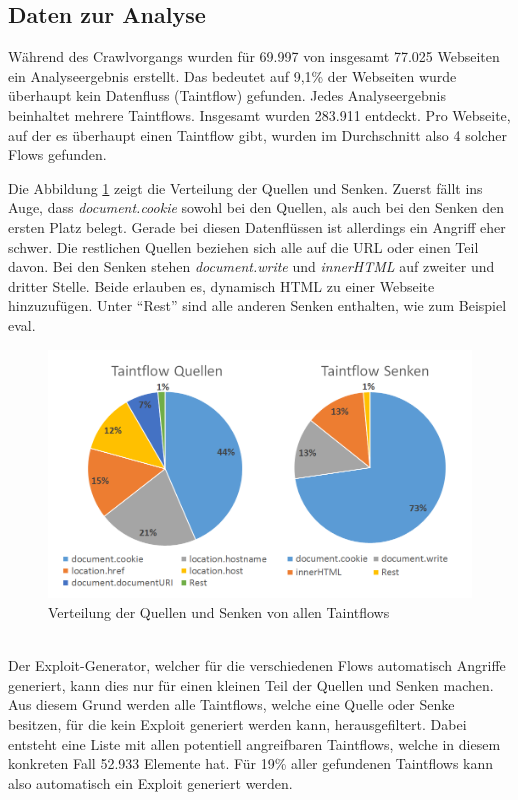 \subsection{Daten zur Analyse}
Während des Crawlvorgangs wurden für 69.997 von insgesamt 77.025 Webseiten ein Analyseergebnis erstellt. Das bedeutet auf 9,1\% der Webseiten wurde überhaupt kein Datenfluss (Taintflow) gefunden. Jedes Analyseergebnis beinhaltet mehrere Taintflows. Insgesamt wurden 283.911 entdeckt. Pro Webseite, auf der es überhaupt einen Taintflow gibt, wurden im Durchschnitt also 4 solcher Flows gefunden. 

Die Abbildung \ref{fig:VerteilungQuellenSenken}  zeigt die Verteilung der Quellen und Senken. Zuerst fällt ins Auge, dass \textit{document.cookie} sowohl bei den Quellen, als auch bei den Senken den ersten Platz belegt. Gerade bei diesen Datenflüssen ist allerdings ein Angriff eher schwer. Die restlichen Quellen beziehen sich alle auf die URL oder einen Teil davon. Bei den Senken stehen \textit{document.write} und \textit{innerHTML} auf zweiter und dritter Stelle. Beide erlauben es, dynamisch HTML zu einer Webseite hinzuzufügen. Unter \enquote{Rest} sind alle anderen Senken enthalten, wie zum Beispiel eval. 

\begin{figure}[h]
	\centering
	\hspace*{-1cm}
	\vspace*{-0.5cm}
	\includegraphics[width=1.15\textwidth]{Bilder/Diagram1.png}
	\caption{Verteilung der Quellen und Senken von allen Taintflows}
	\label{fig:VerteilungQuellenSenken}
\end{figure}
\hspace*{1cm}\\
Der Exploit-Generator, welcher für die verschiedenen Flows automatisch Angriffe generiert, kann dies nur für einen kleinen Teil der Quellen und Senken machen. Aus diesem Grund werden alle Taintflows, welche eine Quelle oder Senke besitzen, für die kein Exploit generiert werden kann, herausgefiltert. Dabei entsteht eine Liste mit allen potentiell angreifbaren Taintflows, welche in diesem konkreten Fall 52.933 Elemente hat. Für 19\% aller gefundenen Taintflows kann also automatisch ein Exploit generiert werden. 


